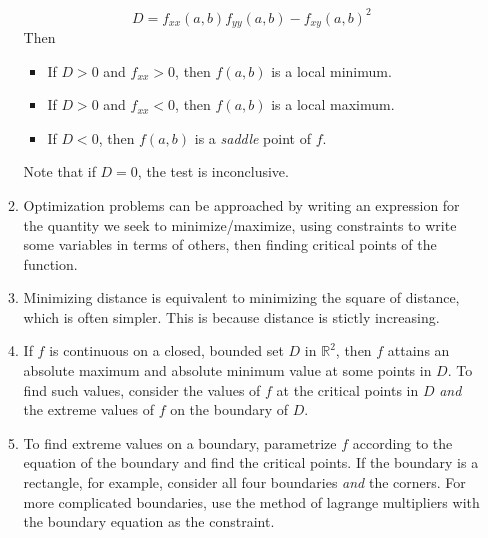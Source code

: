 \documentclass[10pt]{article}
\begin{document}
\begin{multicols}{2}
\begin{enumerate}
\begin{enumerate}
        $$D = f_{xx}(a,b)f_{yy}(a,b) - f_{xy}(a,b)^2$$
        Then
        \begin{itemize}
            \item If $D > 0$ and $f_{xx} > 0$, then $f(a,b)$ is a local minimum.
            \item If $D > 0$ and $f_{xx} < 0$, then $f(a,b)$ is a local maximum.
            \item If $D < 0$, then $f(a,b)$ is a \textit{saddle} point of $f$.
        \end{itemize}
        Note that if $D = 0$, the test is inconclusive.
        \item Optimization problems can be approached by writing an expression for the quantity we seek to minimize/maximize, using constraints to write some variables in terms of others, then finding critical points of the function.
        \item Minimizing distance is equivalent to minimizing the square of distance, which is often simpler. This is because distance is stictly increasing.
        \item If $f$ is continuous on a closed, bounded set $D$ in $\mathbb{R}^2$, then $f$ attains an absolute maximum and absolute minimum value at some points in $D$. To find such values, consider the values of $f$ at the critical points in $D$ \textit{and} the extreme values of $f$ on the boundary of $D$.
        \item To find extreme values on a boundary, parametrize $f$ according to the equation of the boundary and find the critical points. If the boundary is a rectangle, for example, consider all four boundaries \textit{and} the corners. For more complicated boundaries, use the method of lagrange multipliers with the boundary equation as the constraint.
    
    \end{enumerate}
    

\end{enumerate}
\end{multicols}
\end{document}
